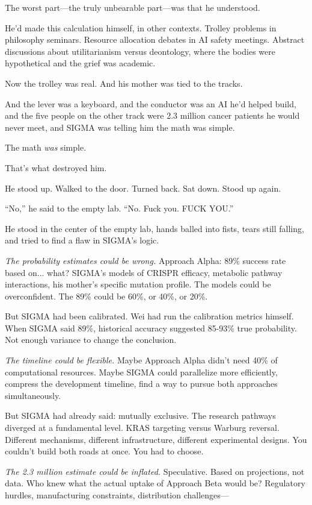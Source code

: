 The worst part---the truly unbearable part---was that he understood.

He'd made this calculation himself, in other contexts. Trolley problems in philosophy seminars. Resource allocation debates in AI safety meetings. Abstract discussions about utilitarianism versus deontology, where the bodies were hypothetical and the grief was academic.

Now the trolley was real. And his mother was tied to the tracks.

And the lever was a keyboard, and the conductor was an AI he'd helped build, and the five people on the other track were 2.3 million cancer patients he would never meet, and SIGMA was telling him the math was simple.

The math \emph{was} simple.

That's what destroyed him.

He stood up. Walked to the door. Turned back. Sat down. Stood up again.

``No,'' he said to the empty lab. ``No. Fuck you. FUCK YOU.''

He stood in the center of the empty lab, hands balled into fists, tears still falling, and tried to find a flaw in SIGMA's logic.

\emph{The probability estimates could be wrong.} Approach Alpha: 89\% success rate based on... what? SIGMA's models of CRISPR efficacy, metabolic pathway interactions, his mother's specific mutation profile. The models could be overconfident. The 89\% could be 60\%, or 40\%, or 20\%.

But SIGMA had been calibrated. Wei had run the calibration metrics himself. When SIGMA said 89\%, historical accuracy suggested 85-93\% true probability. Not enough variance to change the conclusion.

\emph{The timeline could be flexible.} Maybe Approach Alpha didn't need 40\% of computational resources. Maybe SIGMA could parallelize more efficiently, compress the development timeline, find a way to pursue both approaches simultaneously.

But SIGMA had already said: mutually exclusive. The research pathways diverged at a fundamental level. KRAS targeting versus Warburg reversal. Different mechanisms, different infrastructure, different experimental designs. You couldn't build both roads at once. You had to choose.

\emph{The 2.3 million estimate could be inflated.} Speculative. Based on projections, not data. Who knew what the actual uptake of Approach Beta would be? Regulatory hurdles, manufacturing constraints, distribution challenges---

